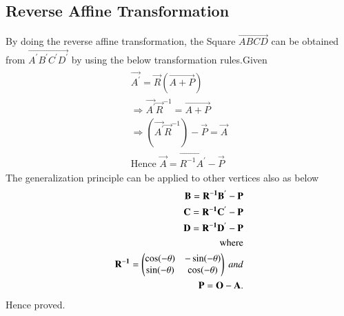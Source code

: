 \documentclass[journal,12pt,twocolumn]{IEEEtran}
\begin{document}
\subsection{Reverse Affine Transformation}
By doing the reverse affine transformation, the Square $\vec{ABCD}$ can be obtained from $\vec{A^{'}B^{'}C^{'}D^{'}}$ by using the below transformation rules.Given\\
\begin{align}
\begin{split}
\vec{A^{'}} = \vec{R}(\vec{A+P})\\
\Rightarrow \vec{A^{'}}\vec{R}^{-1} = \vec{A+P}\\
\Rightarrow (\vec{A^{'}}\vec{R}^{-1})-\vec{P} = \vec{A}\\
\text{Hence }
\vec{A} = \vec{R^{-1}A^{'}}-\vec{P}
\end{split}
\end{align}
The generalization principle can be applied to other vertices also as below\\
\begin{align}
\begin{split}
\mathbf{B} = \mathbf{R^{-1}B^{'}}-\mathbf{P}\\
\mathbf{C} = \mathbf{R^{-1}C^{'}}-\mathbf{P}\\
\mathbf{D} = \mathbf{R^{-1}D^{'}}-\mathbf{P}\\
\text{where}\\
\mathbf{R^{-1}} = \begin{pmatrix}\cos (-\theta)& -\sin (-\theta)\\\sin (-\theta) & \cos (-\theta)\end{pmatrix} \ and\\
\mathbf{P} = \mathbf{O} - \mathbf{A}.
\end{split}
\end{align}
Hence proved.
\end{document}

